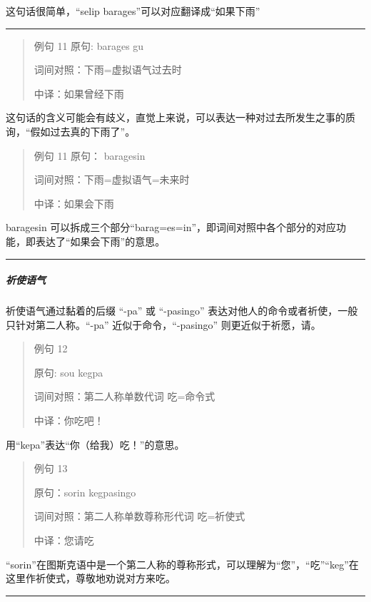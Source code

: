 \documentclass{article}
\begin{document}
这句话很简单，``selip barages''可以对应翻译成``如果下雨''

\begin{center}\rule{0.5\linewidth}{0.5pt}\end{center}

\begin{quote}
例句 11 原句: barages gu

词间对照：下雨=虚拟语气过去时

中译：如果曾经下雨
\end{quote}

这句话的含义可能会有歧义，直觉上来说，可以表达一种对过去所发生之事的质询，``假如过去真的下雨了''。

\begin{quote}
例句 11 原句： baragesin

词间对照：下雨=虚拟语气=未来时

中译：如果会下雨
\end{quote}

baragesin
可以拆成三个部分``barag=es=in''，即词间对照中各个部分的对应功能，即表达了``如果会下雨''的意思。

\begin{center}\rule{0.5\linewidth}{0.5pt}\end{center}

\subparagraph{祈使语气}\label{ux7948ux4f7fux8bedux6c14}

祈使语气通过黏着的后缀 ``-pa'' 或 ``-pasingo''
表达对他人的命令或者祈使，一般只针对第二人称。``-pa''
近似于命令，``-pasingo'' 则更近似于祈愿，请。

\begin{quote}
例句 12

原句: sou kegpa

词间对照：第二人称单数代词 吃=命令式

中译：你吃吧！
\end{quote}

用``kepa''表达``你（给我）吃！''的意思。

\begin{quote}
例句 13

原句：sorin kegpasingo

词间对照：第二人称单数尊称形代词 吃=祈使式

中译：您请吃
\end{quote}

``sorin''在图斯克语中是一个第二人称的尊称形式，可以理解为``您''，``吃''``keg''在这里作祈使式，尊敬地劝说对方来吃。

\begin{center}\rule{0.5\linewidth}{0.5pt}\end{center}
\end{document}
